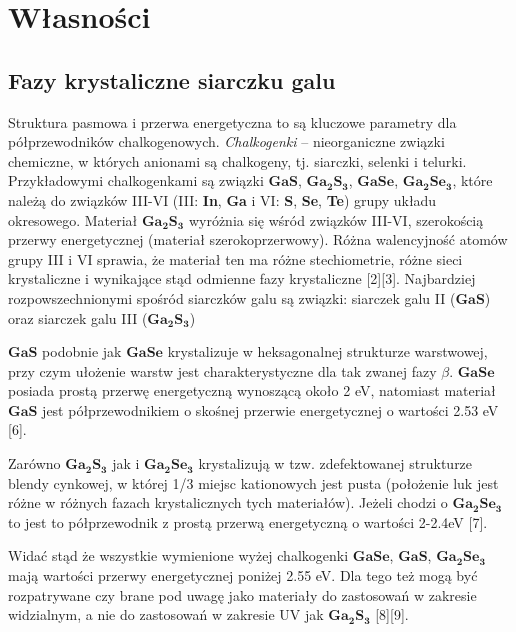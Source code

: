 \newpage
\pagestyle{plain}
\section{Własności}

\subsection{Fazy krystaliczne siarczku galu}
Struktura pasmowa i przerwa energetyczna to są kluczowe parametry dla półprzewodników chalkogenowych. \textit{Chalkogenki} – nieorganiczne związki chemiczne, w których anionami są chalkogeny, tj. siarczki, selenki i telurki. Przykładowymi chalkogenkami są związki $\mathbf{GaS}$, $\mathbf{Ga_{2}S_{3}}$, $\mathbf{GaSe}$, $\mathbf{Ga_{2}Se_{3}}$, które należą do związków III-VI (III: \textbf{In}, \textbf{Ga} i VI: \textbf{S}, \textbf{Se}, \textbf{Te}) grupy układu okresowego. Materiał  $\mathbf{Ga_{2}S_{3}}$ wyróżnia się wśród związków III-VI, szerokością przerwy energetycznej (materiał szerokoprzerwowy). Różna walencyjność atomów grupy III i VI sprawia, że materiał ten ma różne stechiometrie, różne sieci krystaliczne i wynikające stąd odmienne fazy krystaliczne [2][3]. Najbardziej rozpowszechnionymi spośród siarczków galu są związki: siarczek galu II ($\mathbf{GaS}$) oraz siarczek galu III ($\mathbf{Ga_{2}S_{3}}$) 

$\mathbf{GaS}$ podobnie jak $\mathbf{GaSe}$ krystalizuje w heksagonalnej strukturze warstwowej, przy czym ułożenie warstw jest charakterystyczne dla tak zwanej fazy $\beta$. $\mathbf{GaSe}$ posiada prostą przerwę energetyczną wynoszącą około 2 eV, natomiast materiał $\mathbf{GaS}$ jest półprzewodnikiem o skośnej przerwie energetycznej o wartości 2.53 eV [6].

Zarówno $\mathbf{Ga_{2}S_{3}}$ jak i $\mathbf{Ga_{2}Se_{3}}$ krystalizują w tzw. zdefektowanej strukturze blendy cynkowej, w której 1/3 miejsc kationowych jest pusta (położenie luk jest różne w różnych fazach krystalicznych tych materiałów). Jeżeli chodzi o $\mathbf{Ga_{2}Se_{3}}$ to jest to półprzewodnik z prostą przerwą energetyczną o wartości 2-2.4eV [7].

Widać stąd że wszystkie wymienione wyżej chalkogenki $\mathbf{GaSe}$, $\mathbf{GaS}$, $\mathbf{Ga_{2}Se_{3}}$ mają wartości przerwy energetycznej poniżej 2.55 eV. Dla tego też mogą być rozpatrywane czy brane pod uwagę jako materiały do zastosowań w zakresie widzialnym, a nie do zastosowań w zakresie UV jak $\mathbf{Ga_{2}S_{3}}$ [8][9].

